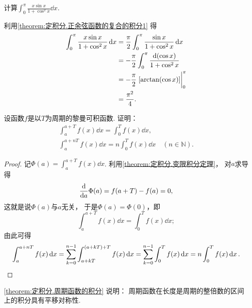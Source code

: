 \begin{example}
计算\(\int_0^\pi \frac{x \sin x}{1 + \cos^2 x} \dd{x}\).
\begin{solution}
利用\cref{theorem:定积分.正余弦函数的复合的积分1} 得\begin{align*}
	\int_0^\pi \frac{x \sin x}{1 + \cos^2 x} \dd{x}
	&= \frac\pi2 \int_0^\pi \frac{\sin x}{1 + \cos^2 x} \dd{x} \\
	&= -\frac\pi2 \int_0^\pi \frac{\dd(\cos x)}{1 + \cos^2 x} \\
	&= -\frac\pi2 \eval{[\arctan(\cos x)]}_0^\pi \\
	&= \frac{\pi^2}4.
\end{align*}
\end{solution}
\end{example}

\begin{proposition}\label{theorem:定积分.周期函数的积分}
设函数\(f\)是以\(T\)为周期的黎曼可积函数.
证明：\begin{gather}
	\int_a^{a+T} f(x) \dd{x} = \int_0^T f(x) \dd{x}, \\
	\int_a^{a+nT} f(x) \dd{x} = n\int_0^T f(x) \dd{x}
	\quad(n\in\mathbb{N}).
\end{gather}
\begin{proof}
记\(\Phi(a) = \int_a^{a+T} f(x) \dd{x}\).
利用\cref{theorem:定积分.变限积分定理}，
对\(a\)求导得\[
	\dv{a} \Phi(a) = f(a+T) - f(a) = 0,
\]
这就是说\(\Phi(a)\)与\(a\)无关，
于是\(\Phi(a) = \Phi(0)\)，即\[
	\int_a^{a+T} f(x) \dd{x} = \int_0^T f(x) \dd{x};
\]
由此可得\[
	\int_a^{a+nT} f(x) \dd{x}
	= \sum_{k=0}^{n-1} \int_{a+kT}^{(a+kT)+T} f(x) \dd{x}
	= \sum_{k=0}^{n-1} \int_0^T f(x) \dd{x}
	= n \int_0^T f(x) \dd{x}.
	\qedhere
\]
\end{proof}
\end{proposition}
\begin{remark}
\cref{theorem:定积分.周期函数的积分} 说明：
周期函数在长度是周期的整倍数的区间上的积分具有平移对称性.
\end{remark}

